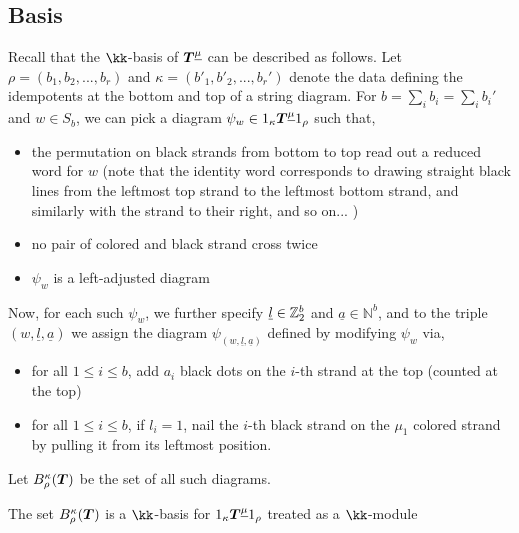 \documentclass{article}
\begin{document}
\begin{defn}
\end{defn}

\subsection{Basis}
Recall that the $\kk$-basis of ${\boldsymbol{T}}^{\underline{\mu}}$ can be described as follows. Let $\rho = (b_1,b_2,...,b_r)$ and $\kappa = (b'_1, b'_2,...,b_r')$ denote the data defining the idempotents at the bottom and top of a string diagram. For $b = \sum_i b_i = \sum_i b_i'$ and $w\in S_b$, we can pick a diagram $\psi_w \in 1_\kappa {\boldsymbol{T}}^{\underline{\mu}} 1_\rho$ such that,
\begin{itemize}
    \item the permutation on black strands from bottom to top read out a reduced word for $w$ (note that the identity word corresponds to drawing straight black lines from the leftmost top strand to the leftmost bottom strand, and similarly with the strand to their right, and so on... )
    \item no pair of colored and black strand cross twice
    \item $\psi_w$ is a left-adjusted diagram
\end{itemize}

Now, for each such $\psi_w $, we further specify $\underline{l} \in {\mathbb Z}^b_2$ and $\underline{a} \in \mathbb{N}^b $, and to the triple $(w,\underline{l},\underline{a})$ we assign the diagram $\psi_{(w,\underline{l},\underline{a})}$ defined by modifying $\psi_w$ via, 
\begin{itemize}
    \item for all $1\leq i\leq b$, add $a_i$ black dots on the $i$-th strand at the top (counted at the top)
    \item for all $1\leq i\leq b$, if $l_i =1$, nail the $i$-th black strand on the $\mu_1$ colored strand by pulling it from its leftmost position. 
\end{itemize}
Let $B^\kappa_\rho({\boldsymbol{T}})$ be the set of all such diagrams. 

\begin{thm}{\cite{Na}}
\label{thm:Tbasis}
    The set $B^\kappa_\rho({\boldsymbol{T}})$ is a $\kk$-basis for $1_\kappa {\boldsymbol{T}}^{\underline{\mu}} 1_\rho$ treated as a $\kk$-module
\end{thm}
\end{document}

